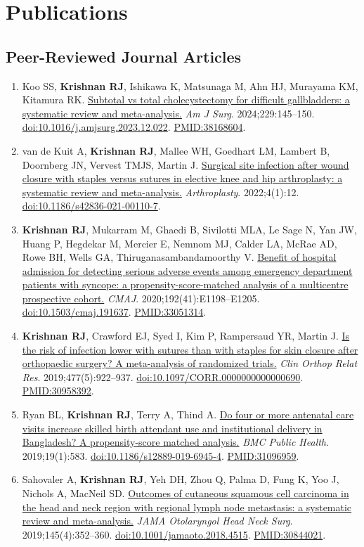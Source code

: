\documentclass[10.5pt,letterpaper]{article}
\newcommand{\myname}{\textbf{Krishnan RJ}}
\newcommand{\doi}[1]{\href{https://doi.org/#1}{doi:#1}}
\newcommand{\pmid}[1]{\href{https://pubmed.ncbi.nlm.nih.gov/#1/}{PMID:#1}}
\newcommand{\pubtitle}[2]{\href{#1}{#2}}
\begin{document}
\section{Publications}
\subsection{Peer-Reviewed Journal Articles}
\begin{enumerate}
\item Koo SS, \myname, Ishikawa K, Matsunaga M, Ahn HJ, Murayama KM, Kitamura RK. \pubtitle{https://doi.org/10.1016/j.amjsurg.2023.12.022}{Subtotal vs total cholecystectomy for difficult gallbladders: a systematic review and meta-analysis.} \textit{Am J Surg}. 2024;229:145--150. \doi{10.1016/j.amjsurg.2023.12.022}. \pmid{38168604}.
\item van de Kuit A, \myname, Mallee WH, Goedhart LM, Lambert B, Doornberg JN, Vervest TMJS, Martin J. \pubtitle{https://doi.org/10.1186/s42836-021-00110-7}{Surgical site infection after wound closure with staples versus sutures in elective knee and hip arthroplasty: a systematic review and meta-analysis.} \textit{Arthroplasty}. 2022;4(1):12. \doi{10.1186/s42836-021-00110-7}.
\item \myname, Mukarram M, Ghaedi B, Sivilotti MLA, Le Sage N, Yan JW, Huang P, Hegdekar M, Mercier E, Nemnom MJ, Calder LA, McRae AD, Rowe BH, Wells GA, Thiruganasambandamoorthy V. \pubtitle{https://doi.org/10.1503/cmaj.191637}{Benefit of hospital admission for detecting serious adverse events among emergency department patients with syncope: a propensity-score-matched analysis of a multicentre prospective cohort.} \textit{CMAJ}. 2020;192(41):E1198--E1205. \doi{10.1503/cmaj.191637}. \pmid{33051314}.
\item \myname, Crawford EJ, Syed I, Kim P, Rampersaud YR, Martin J. \pubtitle{https://doi.org/10.1097/CORR.0000000000000690}{Is the risk of infection lower with sutures than with staples for skin closure after orthopaedic surgery? A meta-analysis of randomized trials.} \textit{Clin Orthop Relat Res}. 2019;477(5):922--937. \doi{10.1097/CORR.0000000000000690}. \pmid{30958392}.
\item Ryan BL, \myname, Terry A, Thind A. \pubtitle{https://doi.org/10.1186/s12889-019-6945-4}{Do four or more antenatal care visits increase skilled birth attendant use and institutional delivery in Bangladesh? A propensity-score matched analysis.} \textit{BMC Public Health}. 2019;19(1):583. \doi{10.1186/s12889-019-6945-4}. \pmid{31096959}.
\item Sahovaler A, \myname, Yeh DH, Zhou Q, Palma D, Fung K, Yoo J, Nichols A, MacNeil SD. \pubtitle{https://doi.org/10.1001/jamaoto.2018.4515}{Outcomes of cutaneous squamous cell carcinoma in the head and neck region with regional lymph node metastasis: a systematic review and meta-analysis.} \textit{JAMA Otolaryngol Head Neck Surg}. 2019;145(4):352--360. \doi{10.1001/jamaoto.2018.4515}. \pmid{30844021}.

\end{enumerate}
\end{document}
